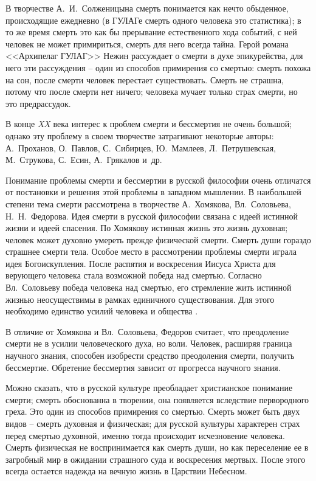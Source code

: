 \documentclass[pscyr,titlepage,chapters]{hedreport}
\begin{document}
  В творчестве А.~И.~Солженицына смерть понимается как нечто обыденное,
  происходящие ежедневно (в ГУЛАГе смерть одного человека это статистика); в то
  же время смерть это как бы прерывание естественного хода событий, с ней
  человек не может примириться, смерть для него всегда тайна. Герой романа
  <<Архипелаг ГУЛАГ>> Нежин рассуждает о смерти в духе эпикурейства, для него
  эти рассуждения – один из способов примирения со смертью: смерть похожа на
  сон, после смерти человек перестает существовать. Смерть не страшна, потому
  что после смерти нет ничего; человека мучает только страх смерти, но это
  предрассудок.

  В конце \emph{XX} века интерес к проблем смерти и бессмертия не очень большой;
  однако эту проблему в своем творчестве затрагивают некоторые авторы:
  А.~Проханов, О.~Павлов, С.~Сибирцев, Ю.~Мамлеев, Л.~Петрушевская, М.~Струкова,
  С.~Есин, А.~Грякалов и~др.

  Понимание проблемы смерти и бессмертии в русской философии очень отличатся от
  постановки и решения этой проблемы в западном мышлении. В наибольшей степени
  тема смерти рассмотрена в творчестве А.~Хомякова, Вл.~Соловьева,
  Н.~Н.~Федорова. Идея смерти в русской философии связана с идеей истинной жизни
  и идеей спасения. По Хомякову истинная жизнь это жизнь духовная; человек может
  духовно умереть прежде физической смерти. Смерть души гораздо страшнее смерти
  тела. Особое место в рассмотрении проблемы смерти играла идея Богоискупления.
  После распятия и воскресения Иисуса Христа для верующего человека стала
  возможной победа над смертью. Согласно Вл.~Соловьеву победа человека над
  смертью, его стремление жить истинной жизнью неосуществимы в рамках единичного
  существования. Для этого необходимо единство усилий человека и общества
  \cite{4}.

  В отличие от Хомякова и Вл.~Соловьева, Федоров считает, что преодоление смерти
  не в усилии человеческого духа, но воли. Человек, расширяя граница научного
  знания, способен изобрести средство преодоления смерти, получить бессмертие.
  Обретение бессмертия зависит от прогресса научного знания.

  Можно сказать, что в русской культуре преобладает христианское понимание
  смерти; смерть обоснованна в творении, она появляется вследствие первородного
  греха. Это один из способов примирения со смертью. Смерть может быть двух
  видов – смерть духовная и физическая; для русской культуры характерен страх
  перед смертью духовной, именно тогда происходит исчезновение человека. Смерть
  физическая не воспринимается как смерть души, но как переселение ее в
  загробный мир в ожидании страшного суда и воскресения мертвых. После этого
  всегда остается надежда на вечную жизнь в Царствии Небесном.
\end{document}

